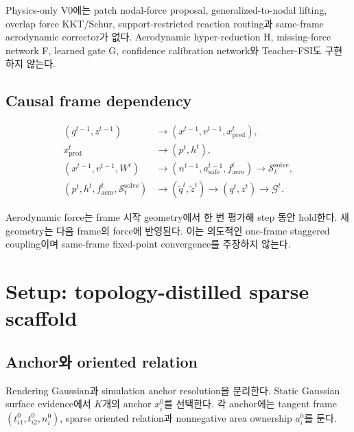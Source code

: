 \documentclass[11pt]{article}
\begin{document}
\begin{tcolorbox}[colback=RejectLight,colframe=RejectRed,title=V0 금지 경로,fonttitle=\bfseries]
Physics-only V0에는 patch nodal-force proposal, generalized-to-nodal lifting,
overlap force KKT/Schur, support-restricted reaction routing과 same-frame aerodynamic
corrector가 없다. Aerodynamic hyper-reduction H, missing-force network F,
learned gate G, confidence calibration network와 Teacher-FSI도 구현하지 않는다.
\end{tcolorbox}

\subsection{Causal frame dependency}

\begin{equation}
\begin{aligned}
  (q^{t-1},z^{t-1})
  &\longrightarrow (x^{t-1},v^{t-1},x_{\mathrm{pred}}^t),\\
  x_{\mathrm{pred}}^t&\longrightarrow (p^t,h^t),\\
  (x^{t-1},v^{t-1},W^t)&\longrightarrow
  (n^{t-1},a_{\mathrm{safe}}^{t-1},f_{\mathrm{aero}}^t)
  \longrightarrow\mathcal S_t^{\mathrm{solve}},\\
  (p^t,h^t,f_{\mathrm{aero}}^t,\mathcal S_t^{\mathrm{solve}})
  &\longrightarrow(\widetilde q^t,\widetilde z^t)
  \longrightarrow(q^t,z^t)
  \longrightarrow \mathcal G^t.
\end{aligned}
  \label{eq:minimal-frame-dependency}
\end{equation}

Aerodynamic force는 frame 시작 geometry에서 한 번 평가해 step 동안 hold한다.
새 geometry는 다음 frame의 force에 반영된다. 이는 의도적인 one-frame staggered coupling이며
same-frame fixed-point convergence를 주장하지 않는다.

\section{Setup: topology-distilled sparse scaffold}

\subsection{Anchor와 oriented relation}

Rendering Gaussian과 simulation anchor resolution을 분리한다.
Static Gaussian surface evidence에서 \(K\)개의 anchor \(x_i^0\)를 선택한다.
각 anchor에는 tangent frame \((t_{i1}^0,t_{i2}^0,n_i^0)\),
sparse oriented relation과 nonnegative area ownership \(a_i^0\)를 둔다.
\end{document}
